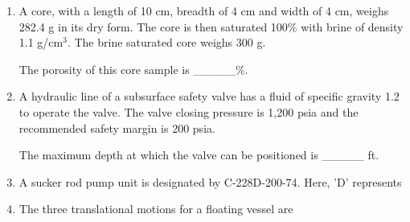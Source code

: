 \documentclass[journal]{IEEEtran}
\begin{document}
\begin{enumerate}
    \hfill{}
    
    \item A core, with a length of 10 cm, breadth of 4 cm and width of 4 cm, weighs 282.4 g in its dry form. The core is then saturated 100\% with brine of density 1.1 g/cm$^3$. The brine saturated core weighs 300 g.
    
    The porosity of this core sample is \_\_\_\_\_\%.
    
    \hfill{}
    
    \item A hydraulic line of a subsurface safety valve has a fluid of specific gravity 1.2 to operate the valve. The valve closing pressure is 1,200 psia and the recommended safety margin is 200 psia.
    
    The maximum depth at which the valve can be positioned is \_\_\_\_\_ ft.
    
    \hfill{}
    
    \item A sucker rod pump unit is designated by C-228D-200-74. Here, 'D' represents
    
    \begin{enumerate}  \end{enumerate}              
    
    \hfill{}
    
    \item The three translational motions for a floating vessel are
    
    \begin{enumerate}  \end{enumerate}              
    

\end{enumerate}
\end{document}
